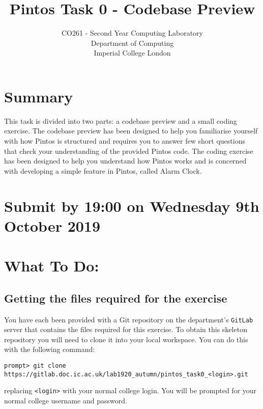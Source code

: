 \documentclass[a4paper,12pt]{article}
\newcommand{\shell}[1]{\lstinline!#1!}
\begin{document}

\title{Pintos Task 0 - Codebase Preview}
\date{}

\author{
CO261 - Second Year Computing Laboratory \\ 
Department of Computing \\ 
Imperial College London
}

\maketitle

\section*{Summary}
This task is divided into two parts: a codebase preview and a small coding exercise.
The codebase preview has been designed to help you familiarise yourself with how Pintos is structured 
and requires you to answer few short questions that check your understanding of the provided Pintos code.
The coding exercise has been designed to help you understand how Pintos works 
and is concerned with developing a simple feature in Pintos, called Alarm Clock.

\section*{Submit by 19:00 on Wednesday 9th October 2019}

\section*{What To Do:}

\subsection*{Getting the files required for the exercise}

You have each been provided with a Git repository on the department's \shell{GitLab} server that contains the files required for this exercise.
To obtain this skeleton repository you will need to clone it into your local workspace.
You can do this with the following command:
%
\begin{lstlisting}
prompt> git clone https://gitlab.doc.ic.ac.uk/lab1920_autumn/pintos_task0_<login>.git
\end{lstlisting}
%
replacing \shell{<login>} with your normal college login.
You will be prompted for your normal college username and password.
\end{document}
